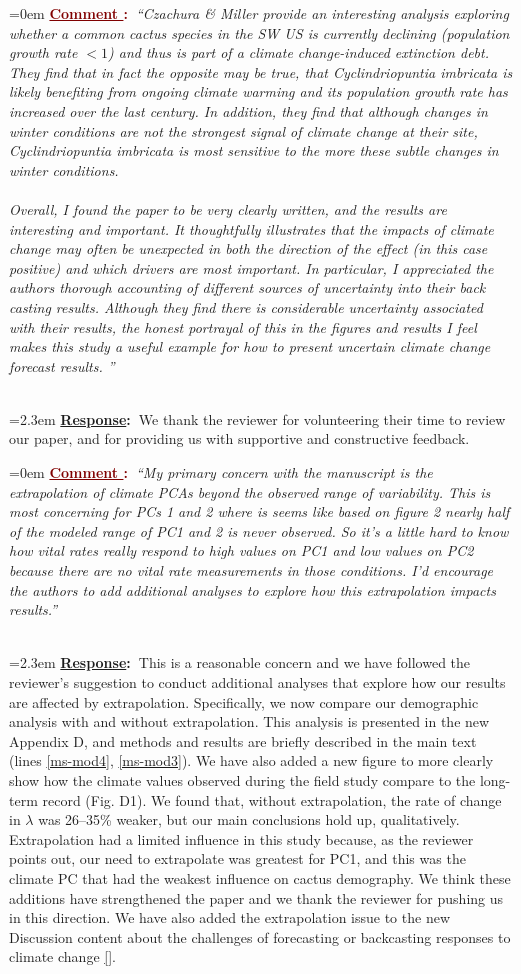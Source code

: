 \documentclass[12pt]{article}
\newcounter{cN}
\newcommand{\comment}[1]{
	\vspace{2em}
	\refstepcounter{cN} %
	\noindent \hangindent=0em \textbf{\textcolor{Maroon}{\uline{Comment \thecN}:~}}\emph{``#1''}
	}
\newcommand{\response}[1]{
	\\[0.25em]
	\hangindent=2.3em \textbf{\textcolor{NavyBlue}{\uline{Response}:~}}#1
	}
\begin{document}
\comment{Czachura \& Miller provide an interesting analysis exploring whether a common cactus species in the SW US is currently declining (population growth rate $<1$) and thus is part of a climate change-induced extinction debt. They find that in fact the opposite may be true, that Cyclindriopuntia imbricata is likely benefiting from ongoing climate warming and its population growth rate has increased over the last century. In addition, they find that although changes in winter conditions are not the strongest signal of climate change at their site, Cyclindriopuntia imbricata is most sensitive to the more these subtle changes in winter conditions. 
\\
\\
Overall, I found the paper to be very clearly written, and the results are interesting and important. It thoughtfully illustrates that the impacts of climate change may often be unexpected in both the direction of the effect (in this case positive) and which drivers are most important.  In particular, I appreciated the authors thorough accounting of different sources of uncertainty into their back casting results. Although they find there is considerable uncertainty associated with their results, the honest portrayal of this in the figures and results I feel makes this study a useful example for how to present uncertain climate change forecast results. 
}
\response{We thank the reviewer for volunteering their time to review our paper, and for providing us with supportive and constructive feedback.}

\comment{My primary concern with the manuscript is the extrapolation of climate PCAs beyond the observed range of variability. This is most concerning for PCs 1 and 2 where is seems like based on figure 2 nearly half of the modeled range of PC1 and 2 is never observed. So it’s a little hard to know how vital rates really respond to high values on PC1 and low values on PC2 because there are no vital rate measurements in those conditions. I’d encourage the authors to add additional analyses to explore how this extrapolation impacts results.}
\response{This is a reasonable concern and we have followed the reviewer's suggestion to conduct additional analyses that explore how our results are affected by extrapolation.
Specifically, we now compare our demographic analysis with and without  extrapolation.
This analysis is presented in the new Appendix D, and methods and results are briefly described in the main text (lines \ref{ms-mod4}, \ref{ms-mod3}).
We have also added a new figure to more clearly show how the climate values observed during the field study compare to the long-term record (Fig. D1). 
We found that, without extrapolation, the rate of change in $\lambda$ was 26--35\% weaker, but our main conclusions hold up, qualitatively. 
Extrapolation had a limited influence in this study because, as the reviewer points out, our need to extrapolate was greatest for PC1, and this was the climate PC that had the weakest influence on cactus demography. 
We think these additions have strengthened the paper and we thank the reviewer for pushing us in this direction.
We have also added the extrapolation issue to the new Discussion content about the challenges of forecasting or backcasting responses to climate change \ref{}.
}
\end{document}

